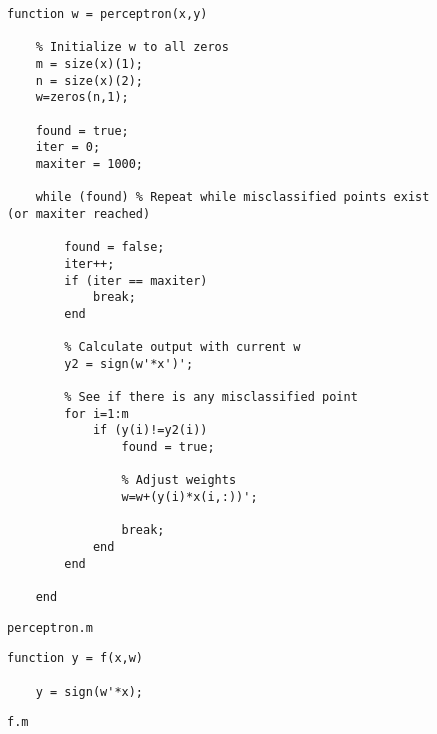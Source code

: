 \documentclass[11pt]{article}
\begin{document}
\begin{figure}[h]
\captionsetup{justification=raggedright,
singlelinecheck=false
}
\caption{\texttt{perceptron.m}}
\begin{lstlisting}
function w = perceptron(x,y)

    % Initialize w to all zeros
    m = size(x)(1);
    n = size(x)(2);
    w=zeros(n,1);

    found = true;
    iter = 0;
    maxiter = 1000;

    while (found) % Repeat while misclassified points exist (or maxiter reached)
        
        found = false;
        iter++;
        if (iter == maxiter)
            break;
        end

        % Calculate output with current w
        y2 = sign(w'*x')';

        % See if there is any misclassified point
        for i=1:m
            if (y(i)!=y2(i))
                found = true;

                % Adjust weights
                w=w+(y(i)*x(i,:))';

                break;
            end
        end

    end
\end{lstlisting}
\label{perceptron.m}
\end{figure}

\begin{figure}[h]
\captionsetup{justification=raggedright,
singlelinecheck=false
}
\caption{\texttt{f.m}}
\begin{lstlisting}
function y = f(x,w)
  
    y = sign(w'*x);
\end{lstlisting}
\label{f.m}
\end{figure}
\end{document}
